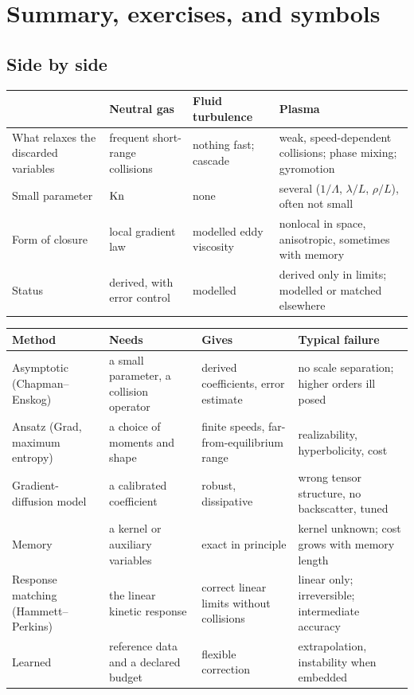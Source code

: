 \section{Summary, exercises, and symbols}
\label{sec:summary}

\subsection{Side by side}

\begin{center}
\renewcommand{\arraystretch}{1.4}
\begin{tabularx}{\textwidth}{@{}P{2.7cm}P{2.8cm}P{2.8cm}Y@{}}
\toprule
  & Neutral gas & Fluid turbulence & Plasma \\
\midrule
  What relaxes the discarded variables
    & frequent short-range collisions
    & nothing fast; cascade
    & weak, speed-dependent collisions; phase mixing; gyromotion \\
  Small parameter
    & $\mathrm{Kn}$
    & none
    & several ($1/\Lambda$, $\lambda/L$, $\rho/L$), often not small \\
  Form of closure
    & local gradient law
    & modelled eddy viscosity
    & nonlocal in space, anisotropic, sometimes with memory \\
  Status
    & derived, with error control
    & modelled
    & derived only in limits; modelled or matched elsewhere \\
\bottomrule
\end{tabularx}
\end{center}

\begin{center}
\renewcommand{\arraystretch}{1.3}
\begin{tabularx}{\textwidth}{@{}P{3.0cm}P{3.6cm}YY@{}}
\toprule
Method & Needs & Gives & Typical failure \\
\midrule
Asymptotic (Chapman--Enskog) & a small parameter, a collision operator
  & derived coefficients, error estimate
  & no scale separation; higher orders ill posed \\
Ansatz (Grad, maximum entropy) & a choice of moments and shape
  & finite speeds, far-from-equilibrium range
  & realizability, hyperbolicity, cost \\
Gradient-diffusion model & a calibrated coefficient
  & robust, dissipative
  & wrong tensor structure, no backscatter, tuned \\
Memory & a kernel or auxiliary variables
  & exact in principle
  & kernel unknown; cost grows with memory length \\
Response matching (Hammett--Perkins) & the linear kinetic response
  & correct linear limits without collisions
  & linear only; irreversible; intermediate accuracy \\
Learned & reference data and a declared budget
  & flexible correction
  & extrapolation, instability when embedded \\
\bottomrule
\end{tabularx}
\end{center}

